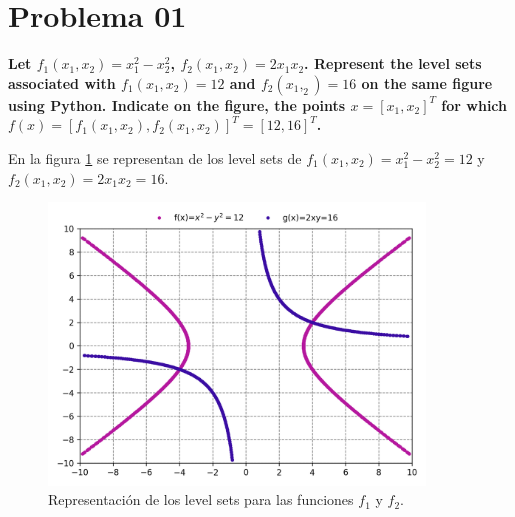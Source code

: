 \section*{Problema 01}

\textbf{Let $f_1(x_1,x_2)=x_1^2-x_2^2$, $f_2(x_1,x_2)=2x_1x_2$. Represent the level sets associated with $f_1(x_1,x_2)=12$ and $f_2(x_1,_2)=16$ on the same figure using Python. Indicate on the figure, the points $x=[x_1,x_2]^T$ for which $f(x)=[f_1(x_1,x_2),f_2(x_1,x_2)]^T=[12,16]^T$.}

En la figura \ref{fig:level_set} se representan de los level sets de $f_1(x_1,x_2)=x^2_1-x^2_2=12$ y  $f_2(x_1,x_2)=2x_1x_2=16$.

\begin{figure}[H]
    \centering
    \includegraphics[width=10cm]{Graphics/problema01.png}
    \caption{Representación de los level sets para las funciones $f_1$ y $f_2$.}
    \label{fig:level_set}
\end{figure}